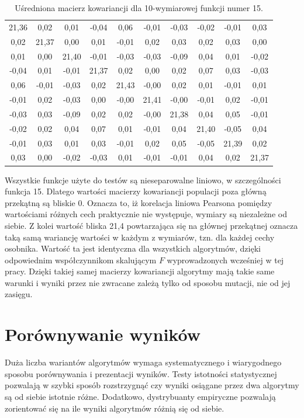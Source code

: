 \documentclass[a4paper,onecolumn,oneside,11pt,wide,floatssmall]{mwrep}
\theoremstyle{definition}
\theoremstyle{plain}%
\theoremstyle{remark}
\begin{document}
\begin{table}[H]
\centering
\begin{tabular}{ c c c c c c c c c c }
21,36 & 0,02 & 0,01 & -0,04 & 0,06 & -0,01 & -0,03 & -0,02 & -0,01 & 0,03 \\
0,02 & 21,37 & 0,00 & 0,01 & -0,01 & 0,02 & 0,03 & 0,02 & 0,03 & 0,00 \\
0,01 & 0,00 & 21,40 & -0,01 & -0,03 & -0,03 & -0,09 & 0,04 & 0,01 & -0,02 \\
-0,04 & 0,01 & -0,01 & 21,37 & 0,02 & 0,00 & 0,02 & 0,07 & 0,03 & -0,03 \\
0,06 & -0,01 & -0,03 & 0,02 & 21,43 & -0,00 & 0,02 & 0,01 & -0,01 & 0,01 \\
-0,01 & 0,02 & -0,03 & 0,00 & -0,00 & 21,41 & -0,00 & -0,01 & 0,02 & -0,01 \\
-0,03 & 0,03 & -0,09 & 0,02 & 0,02 & -0,00 & 21,38 & 0,04 & 0,05 & -0,01 \\
-0,02 & 0,02 & 0,04 & 0,07 & 0,01 & -0,01 & 0,04 & 21,40 & -0,05 & 0,04 \\
-0,01 & 0,03 & 0,01 & 0,03 & -0,01 &  0,02 & 0,05 & -0,05 & 21,39 & 0,02 \\
0,03 & 0,00 & -0,02 & -0,03 & 0,01 & -0,01 & -0,01 &  0,04 & 0,02 & 21,37 \\
\end{tabular}
\caption{Uśredniona macierz kowariancji dla 10-wymiarowej funkcji numer 15.}
\label{table:cov_matrix}
\end{table}

Wszystkie funkcje użyte do testów są nieseparowalne liniowo, w szczególności funkcja 15.
Dlatego wartości macierzy kowariancji populacji poza główną przekątną są bliskie 0. Oznacza to,
iż korelacja liniowa Pearsona pomiędzy wartościami różnych cech praktycznie nie występuje, wymiary
są niezależne od siebie. Z kolei wartość bliska 21,4 powtarzająca się na głównej przekątnej 
oznacza taką samą wariancję wartości w każdym z wymiarów, tzn. dla każdej cechy osobnika.
Wartość ta jest identyczna dla wszystkich algorytmów, dzięki odpowiednim współczynnikom skalującym
$F$ wyprowadzonych wcześniej w tej pracy. Dzięki takiej samej macierzy kowariancji algorytmy
mają takie same warunki i wyniki przez nie zwracane zależą tylko od sposobu mutacji, nie od jej
zasięgu.

\section{Porównywanie wyników}

Duża liczba wariantów algorytmów wymaga systematycznego i wiarygodnego sposobu porównywania
i prezentacji wyników. Testy istotności statystycznej pozwalają w szybki sposób rozstrzygnąć czy 
wyniki osiągane przez dwa algorytmy są od siebie istotnie różne. Dodatkowo, dystrybuanty empiryczne
pozwalają zorientować się na ile wyniki algorytmów różnią się od siebie.
\end{document}
